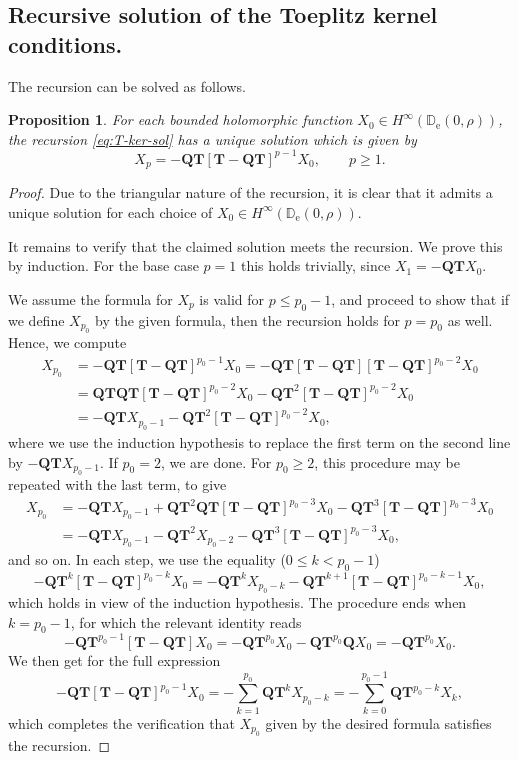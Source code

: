 \documentclass{amsart}
\newcommand{\be}{\begin{equation}}
\newcommand{\ee}{\end{equation}}
\newcommand{\D}{\mathbb{D}}
\newcommand{\Top}{\mathbf{T}}
\newcommand{\Qop}{\mathbf{Q}}
\newtheorem{prop}[thm]{Proposition}
\theoremstyle{definition}
\theoremstyle{remark}
\newcommand{\e}{\mathrm{e}}
\numberwithin{equation}{subsection}
\begin{document}
\subsection{Recursive solution of the Toeplitz kernel conditions.} 
The recursion can be solved as follows.
\begin{prop}\label{prop:recursion}
For each bounded holomorphic function 
$X_0\in H^\infty(\D_\e(0,\rho))$, 
the recursion \eqref{eq:T-ker-sol}
has a unique solution which is given by
\be
X_p=-\Qop\Top[\Top-\Qop\Top]^{p-1}X_0,\qquad p\ge 1.
\ee
\end{prop}

\begin{proof}
Due to the triangular nature of the recursion, 
it is clear that it admits a unique solution for 
each choice of $X_0\in H^\infty(\D_\e(0,\rho))$.

It remains to verify that the claimed solution meets the recursion.
We prove this by induction. For the base case
$p=1$ this holds trivially, since $X_1=-\Qop\Top X_0$.

We assume the formula for $X_p$ is valid for
$p\le p_0-1$, and proceed to show that if we define $X_{p_0}$ by
the given formula, then the recursion holds for 
$p=p_0$ as well.
Hence, we compute
\begin{align}
X_{p_0}&=-\Qop\Top[\Top-\Qop\Top]^{p_0-1}X_0=-\Qop\Top[\Top-\Qop\Top]
[\Top-\Qop\Top]^{p_0-2}X_0\\
&=\Qop\Top\Qop\Top[\Top-\Qop\Top]^{p_0-2}X_0-\Qop\Top^2
[\Top-\Qop\Top]^{p_0-2}X_0\\
&=-\Qop\Top X_{p_0-1}-\Qop\Top^2[\Top-\Qop\Top]^{p_0-2}X_0,
\end{align}
where we use the induction hypothesis to replace the first term on the 
second line by $-\Qop\Top X_{p_0-1}$.
If $p_0=2$, we are done. For $p_0\ge 2$, this procedure may be repeated 
with the last term, to give
\begin{align}
X_{p_0}&=-\Qop\Top X_{p_0-1} + \Qop\Top^2\Qop\Top[\Top-\Qop\Top]^{p_0-3}X_0 
- \Qop\Top^3[\Top-\Qop\Top]^{p_0-3}X_0\\
&=-\Qop\Top X_{p_0-1}-\Qop\Top^2 X_{p_0-2} - \Qop\Top^3[\Top-\Qop\Top]^{p_0-3}X_0,
\end{align}
and so on. In each step, we use the equality ($0\le k<p_0-1$)
\be
-\Qop\Top^{k}[\Top-\Qop\Top]^{p_0-k}X_0=
-\Qop\Top^{k}X_{p_0-k}-\Qop\Top^{k+1}[\Top-\Qop\Top]^{p_0-k-1}X_0,
\ee
which holds in view of the induction hypothesis.
The procedure ends when $k=p_0-1$, for which the relevant identity
reads
\be
-\Qop\Top^{p_0-1}[\Top-\Qop\Top]X_0=-\Qop\Top^{p_0} X_{0}-
\Qop\Top^{p_0}\Qop X_0=-\Qop\Top^{p_0} X_0.
\ee 
We then get for the full expression
\be
-\Qop\Top[\Top-\Qop\Top]^{p_0-1}X_0=-\sum_{k=1}^{p_0}\Qop\Top^k X_{p_0-k}
=-\sum_{k=0}^{p_0-1}\Qop\Top^{p_0-k}X_k,
\ee
which completes the verification that $X_{p_0}$ given by the desired formula
satisfies the recursion.
\end{proof}
\end{document}
